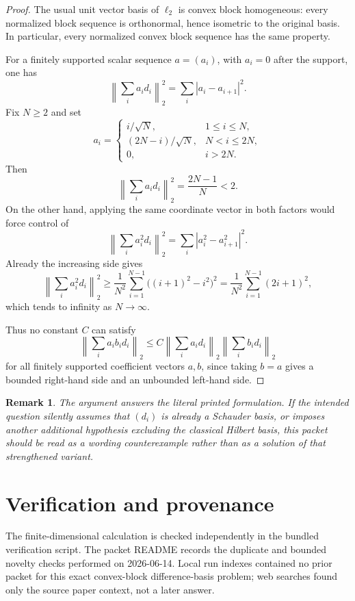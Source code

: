 \documentclass[11pt]{article}
\newtheorem*{remark}{Remark}
\begin{document}
\begin{proof}
The usual unit vector basis of \(\ell_2\) is convex block homogeneous:
every normalized block sequence is orthonormal, hence isometric to the
original basis.  In particular, every normalized convex block sequence
has the same property.

For a finitely supported scalar sequence \(a=(a_i)\), with \(a_i=0\)
after the support, one has
\[
 \left\|\sum_i a_i d_i\right\|_2^2
   =\sum_i |a_i-a_{i+1}|^2 .
\]
Fix \(N\geq 2\) and set
\[
a_i =
\begin{cases}
i/\sqrt N, & 1\leq i\leq N,\\
(2N-i)/\sqrt N, & N<i\leq 2N,\\
0, & i>2N .
\end{cases}
\]
Then
\[
 \left\|\sum_i a_i d_i\right\|_2^2
   = \frac{2N-1}{N}<2 .
\]
On the other hand, applying the same coordinate vector in both factors
would force control of
\[
 \left\|\sum_i a_i^2 d_i\right\|_2^2
  = \sum_i |a_i^2-a_{i+1}^2|^2 .
\]
Already the increasing side gives
\[
 \left\|\sum_i a_i^2 d_i\right\|_2^2
 \geq \frac{1}{N^2}\sum_{i=1}^{N-1}\bigl((i+1)^2-i^2\bigr)^2
 = \frac{1}{N^2}\sum_{i=1}^{N-1}(2i+1)^2 ,
\]
which tends to infinity as \(N\to\infty\).

Thus no constant \(C\) can satisfy
\[
 \left\|\sum_i a_i b_i d_i\right\|_2
 \leq C
 \left\|\sum_i a_i d_i\right\|_2
 \left\|\sum_i b_i d_i\right\|_2
\]
for all finitely supported coefficient vectors \(a,b\), since taking
\(b=a\) gives a bounded right-hand side and an unbounded left-hand side.
\end{proof}

\begin{remark}
The argument answers the literal printed formulation.  If the intended
question silently assumes that \((d_i)\) is already a Schauder basis, or
imposes another additional hypothesis excluding the classical Hilbert
basis, this packet should be read as a wording counterexample rather than
as a solution of that strengthened variant.
\end{remark}

\section*{Verification and provenance}

The finite-dimensional calculation is checked independently in the bundled
verification script.  The packet README records the duplicate and bounded
novelty checks performed on 2026-06-14.  Local run indexes contained no
prior packet for this exact convex-block difference-basis problem; web
searches found only the source paper context, not a later answer.
\end{document}
